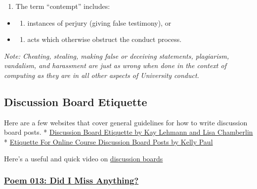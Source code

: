 \begin{enumerate}
\def\labelenumi{\arabic{enumi}.}
\setcounter{enumi}{5}
\tightlist
\item
  The term ``contempt'' includes:
\end{enumerate}

\begin{itemize}
\item
  \begin{enumerate}
  \def\labelenumi{(\alph{enumi})}
  \tightlist
  \item
    instances of perjury (giving false testimony), or
  \end{enumerate}
\item
  \begin{enumerate}
  \def\labelenumi{(\alph{enumi})}
  \setcounter{enumi}{1}
  \tightlist
  \item
    acts which otherwise obstruct the conduct process.
  \end{enumerate}
\end{itemize}

\emph{Note: Cheating, stealing, making false or deceiving statements, plagiarism, vandalism, and harassment are just as wrong when done in the context of computing as they are in all other aspects of University conduct.}

\hypertarget{discussion-board-etiquette}{%
\subsection{Discussion Board Etiquette}\label{discussion-board-etiquette}}

Here are a few websites that cover general guidelines for how to write discussion board posts.
* \href{https://www2.uwstout.edu/content/profdev/rubrics/discuss_etiquette.html}{Discussion Board Etiquette by Kay Lehmann and Lisa Chamberlin}
* \href{http://learnmore.uncg.edu/blog/etiquette-for-online-course-discussion-boards}{Etiquette For Online Course Discussion Board Posts by Kelly Paul}

Here's a useful and quick video on \href{https://www.youtube.com/watch?v=tg3y2A9pdtI}{discussion boards}

\hypertarget{poem-013-did-i-miss-anything}{%
\subsubsection{\texorpdfstring{\href{https://www.loc.gov/programs/poetry-and-literature/poet-laureate/poet-laureate-projects/poetry-180/all-poems/item/poetry-180-013/did-i-miss-anything/}{Poem 013: Did I Miss Anything?}}{Poem 013: Did I Miss Anything?}}\label{poem-013-did-i-miss-anything}}


